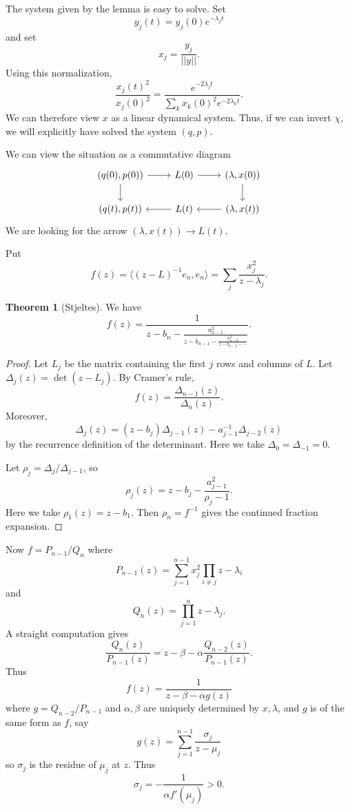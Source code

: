 \documentclass[12pt]{report}
\theoremstyle{definition}
\newtheorem{theorem}{Theorem}[chapter]
\begin{document}
The system given by the lemma is easy to solve. Set
$$y_j(t) = y_j(0)e^{-\lambda_jt}$$
and set
$$x_j = \frac{y_j}{||y||}.$$
Using this normalization,
$$\frac{x_j(t)^2}{x_j(0)^2} = \frac{e^{-2\lambda_jt}}{\sum_k x_k(0)^2e^{-2\lambda_kt}}.$$
We can therefore view $x$ as a linear dynamical system.
Thus, if we can invert $\chi$, we will explicitly have solved the system $(q, p)$.

We can view the situation as a commutative diagram
$$
\begin{tikzcd}
(q(0), p(0)) \arrow[r]\arrow[d] &L(0) \arrow[r] & (\lambda, x(0))\arrow[d]\\
(q(t), p(t)) & L(t)\arrow[l] & (\lambda, x(t))\arrow[l]
\end{tikzcd}
$$
We are looking for the arrow $(\lambda, x(t)) \to L(t)$.

Put
$$f(z) = \langle (z-L)^{-1}e_n, e_n\rangle = \sum_j \frac{x_j^2}{z - \lambda_j}.$$
\begin{theorem}[Stjeltes]
We have
$$f(z) = \frac{1}{z - b_n - \frac{a_{n-1}^2}{z - b_{n-1} - \frac{a_{n-2}^2}{z - b_{n-2} - \cdots}}}.$$
\end{theorem}
\begin{proof}
Let $L_j$ be the matrix containing the first $j$ rows and columns of $L$. Let $\Delta_j(z) = \det(z - L_j)$.
By Cramer's rule,
$$f(z) = \frac{\Delta_{n-1}(z)}{\Delta_n(z)}.$$
Moreover,
$$\Delta_j(z) = (z - b_j)\Delta_{j-1}(z) - a_{j-1}^{-1}\Delta_{j-2}(z)$$
by the recurrence definition of the determinant.
Here we take $\Delta_0 = \Delta_{-1} = 0$.

Let $\rho_j = \Delta_j/\Delta_{j-1}$, so
$$\rho_j(z) = z - b_j - \frac{a_{j-1}^2}{\rho_j - 1}.$$
Here we take $\rho_1(z) = z - b_1$.
Then $\rho_n = f^{-1}$ gives the continued fraction expansion.
\end{proof}
Now $f = P_{n-1}/Q_n$ where
$$P_{n-1}(z) = \sum_{j=1}^{n-1} x_j^2 \prod_{i \neq j} z - \lambda_i$$
and
$$Q_n(z) = \prod_{j=1}^n z - \lambda_j.$$
A straight computation gives
$$\frac{Q_n(z)}{P_{n-1}(z)} = z - \beta - \alpha\frac{Q_{n-2}(z)}{P_{n-1}(z)}.$$
Thus
$$f(z) = \frac{1}{z - \beta - \alpha g(z)}$$
where $g=Q_{n-2}/P_{n-1}$ and $\alpha,\beta$ are uniquely determined by $x, \lambda$, and $g$ is of the same form as $f$, say
$$g(z) = \sum_{j=1}^{n-1}\frac{\sigma_j}{z - \mu_j}$$
so $\sigma_j$ is the residue of $\mu_j$ at $z$. Thus
$$\sigma_j = -\frac{1}{\alpha f'(\mu_j)} > 0.$$
\end{document}
